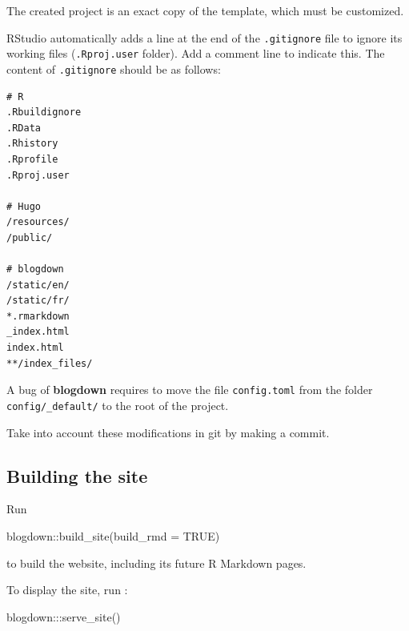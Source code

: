 \documentclass[
  12pt,
  american,
  a4paper,
  extrafontsizes,onecolumn,openright
  ]{memoir}
\newenvironment{Shaded}{\begin{snugshade}}{\end{snugshade}}
\newcommand{\AttributeTok}[1]{\textcolor[rgb]{0.77,0.63,0.00}{#1}}
\newcommand{\ConstantTok}[1]{\textcolor[rgb]{0.00,0.00,0.00}{#1}}
\newcommand{\FunctionTok}[1]{\textcolor[rgb]{0.00,0.00,0.00}{#1}}
\newcommand{\NormalTok}[1]{#1}
\newcommand{\SpecialCharTok}[1]{\textcolor[rgb]{0.00,0.00,0.00}{#1}}
\begin{document}
\normalsize

The created project is an exact copy of the template, which must be customized.

RStudio automatically adds a line at the end of the \texttt{.gitignore} file to ignore its working files (\texttt{.Rproj.user} folder).
Add a comment line to indicate this.
The content of \texttt{.gitignore} should be as follows:

\begin{verbatim}
# R
.Rbuildignore
.RData
.Rhistory
.Rprofile
.Rproj.user

# Hugo
/resources/
/public/

# blogdown
/static/en/
/static/fr/
*.rmarkdown
_index.html
index.html
**/index_files/
\end{verbatim}

A bug of \textbf{blogdown} requires to move the file \texttt{config.toml} from the folder \texttt{config/\_default/} to the root of the project.

Take into account these modifications in git by making a commit.

\hypertarget{building-the-site}{%
\subsection{Building the site}\label{building-the-site}}

Run

\scriptsize

\begin{Shaded}
\begin{Highlighting}[]
\NormalTok{blogdown}\SpecialCharTok{::}\FunctionTok{build\_site}\NormalTok{(}\AttributeTok{build\_rmd =} \ConstantTok{TRUE}\NormalTok{)}
\end{Highlighting}
\end{Shaded}

\normalsize

to build the website, including its future R Markdown pages.

To display the site, run :

\scriptsize

\begin{Shaded}
\begin{Highlighting}[]
\NormalTok{blogdown}\SpecialCharTok{:::}\FunctionTok{serve\_site}\NormalTok{()}
\end{Highlighting}
\end{Shaded}

\normalsize
\end{document}
